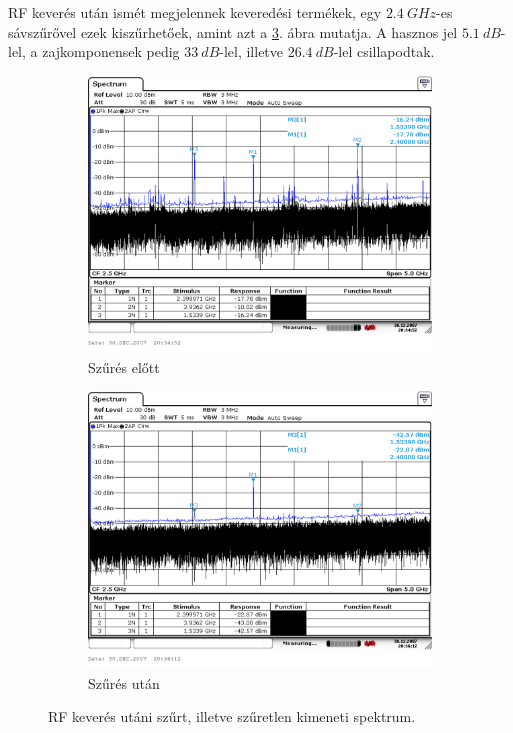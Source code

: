 RF keverés után ismét megjelennek keveredési termékek, egy $\SI{2.4}{GHz}$-es sávszűrővel ezek kiszűrhetőek, amint azt a \ref{fig:RF}. ábra mutatja. A hasznos jel $\SI{5.1}{dB}$-lel, a zajkomponensek pedig $\SI{33}{dB}$-lel, illetve $\SI{26.4}{dB}$-lel csillapodtak.

\begin{figure}[H]
	\centering
	\begin{subfigure}[b]{0.49\textwidth}
		\includegraphics[width=\textwidth,keepaspectratio]{kepek/A_csop_015.PNG}
		\caption{Szűrés előtt}
		\label{fig:RF_elotte}
	\end{subfigure}
	\begin{subfigure}[b]{0.49\textwidth}
		\includegraphics[width=\textwidth,keepaspectratio]{kepek/A_csop_016.PNG}
		\caption{Szűrés után}
		\label{fig:RF_utana}
	\end{subfigure}
	\caption{RF keverés utáni szűrt, illetve szűretlen kimeneti spektrum.}
	\label{fig:RF}
\end{figure}

